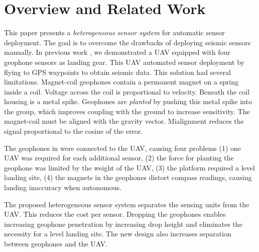 \section{Overview and Related Work}\label{sec:RelatedWork}

This paper presents a \emph{heterogeneous sensor system} for automatic sensor deployment. The goal is to overcome the drawbacks of deploying seismic sensors manually. 
In previous work \cite{sudarshan2015using}, we demonstrated a UAV equipped with four geophone sensors as landing gear.
This UAV automated sensor deployment by flying to GPS waypoints to obtain seismic data. 
This solution had several limitations.
Magnet-coil geophones contain a permanent magnet on a spring inside a coil. Voltage across the coil is proportional to velocity.  Beneath the coil housing is a metal spike.  Geophones are \emph{planted} by pushing this metal spike into the group, which improves coupling with the ground to increase sensitivity. The magnet-coil must be aligned with the gravity vector. Mialignment reduces the signal proportional to the cosine of the error.

The geophones in  \cite{sudarshan2015using} were connected to the UAV, causing four problems
(1) one UAV was required for each additional sensor,
(2)  the force for planting the geophone was limited by the weight of the UAV,
(3) the platform required a level landing site,
(4) the magnets in the geophones distort compass readings, causing landing inaccuracy when autonomous.

The proposed heterogeneous sensor system separates the sensing units from the UAV.
This reduces the cost per sensor. 
Dropping the geophones enables increasing geophone penetration by increasing drop height and eliminates the necessity for a level landing site.
The new design also increases separation between geophones and the UAV.

